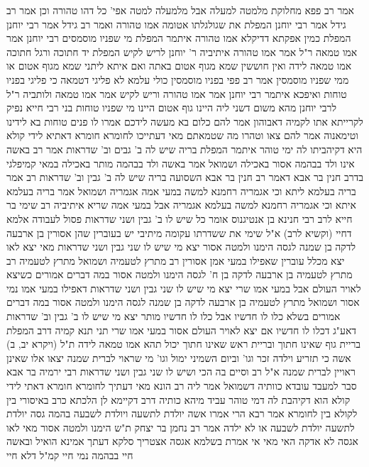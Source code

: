 \documentclass[12pt, openany]{book}
\begin{document}
{אמר רב פפא  מחלוקת מלמטה למעלה אבל מלמעלה למטה אפי' כל דהו טהורה  וכן אמר רב גידל אמר רבי יוחנן  המפלת את שגולגלתו אטומה אמו טהורה 
ואמר רב גידל אמר רבי יוחנן  המפלת כמין אפקתא דדיקלא אמו טהורה 
איתמר המפלת מי שפניו מוסמסים  רבי יוחנן אמר  אמו טמאה ר"ל אמר  אמו טהורה 
איתיביה ר' יוחנן לריש לקיש  המפלת יד חתוכה ורגל חתוכה אמו טמאה לידה ואין חוששין שמא מגוף אטום באתה  ואם איתא ליתני שמא מגוף אטום או ממי שפניו מוסמסין 
אמר רב פפי  בפניו מוסמסין כולי עלמא לא פליגי דטמאה כי פליגי בפניו טוחות ואיפכא איתמר רבי יוחנן אמר  אמו טהורה וריש לקיש אמר  אמו טמאה 
ולותביה ר"ל לרבי יוחנן מהא  משום דשני ליה  היינו גוף אטום היינו מי שפניו טוחות 
בני רבי חייא נפיק לקרייתא אתו לקמיה דאבוהון אמר להם   כלום בא מעשה לידכם  אמרו לו  פנים טוחות בא לידינו וטימאנוה 
אמר להם  צאו וטהרו מה שטמאתם  מאי דעתייכו לחומרא חומרא דאתיא לידי קולא היא דקיהביתו לה ימי טוהר 
איתמר המפלת בריה שיש לה ב' גבים וב' שדראות  אמר רב  באשה אינו ולד בבהמה אסור באכילה  ושמואל אמר  באשה ולד בבהמה מותר באכילה 
במאי קמיפלגי  בדרב חנין בר אבא דאמר רב חנין בר אבא  השסועה בריה שיש לה ב' גבין וב' שדראות 
רב אמר  בריה בעלמא ליתא וכי אגמריה רחמנא למשה במעי אמה אגמריה  ושמואל אמר  בריה בעלמא איתא וכי אגמריה רחמנא למשה בעלמא אגמריה אבל במעי אמה שריא 
איתיביה רב שימי בר חייא לרב  רבי חנינא בן אנטיגנוס אומר כל שיש לו ב' גבין ושני שדראות פסול לעבודה אלמא דחיי  (וקשיא לרב)  א"ל  שימי את  ששדרתו עקומה 
מיתיבי  יש בעוברין שהן אסורין  בן ארבעה לדקה בן שמנה לגסה הימנו ולמטה אסור  יצא מי שיש לו שני גבין ושני שדראות 
מאי יצא  לאו יצא מכלל עוברין שאפילו במעי אמן אסורין 
רב מתרץ לטעמיה ושמואל מתרץ לטעמיה  רב מתרץ לטעמיה  בן ארבעה לדקה בן ח' לגסה הימנו ולמטה אסור 
במה דברים אמורים כשיצא לאויר העולם אבל במעי אמו שרי יצא מי שיש לו שני גבין ושני שדראות דאפילו במעי אמו נמי אסור
ושמואל מתרץ לטעמיה  בן ארבעה לדקה בן שמנה לגסה הימנו ולמטה אסור  במה דברים אמורים בשלא כלו לו חדשיו אבל כלו לו חדשיו מותר  יצא מי שיש לו ב' גבין וב' שדראות דאע"ג דכלו לו חדשיו אם יצא לאויר העולם אסור במעי אמו שרי 
תני תנא קמיה דרב  המפלת בריית גוף שאינו חתוך ובריית ראש שאינו חתוך יכול תהא אמו טמאה לידה ת"ל (ויקרא יב, ב) אשה כי תזריע וילדה זכר וגו' וביום השמיני ימול וגו'
מי שראוי לברית שמנה יצאו אלו שאינן ראויין לברית שמנה  א"ל רב  וסיים בה הכי ושיש לו שני גבין ושני שדראות 
רבי ירמיה בר אבא סבר למעבד עובדא כוותיה דשמואל אמר ליה רב הונא  מאי דעתיך לחומרא  חומרא דאתי לידי קולא הוא דקיהבת לה דמי טוהר  עביד מיהא כותיה דרב דקיימא לן  הלכתא כרב באיסורי בין לקולא בין לחומרא 
אמר רבא  הרי אמרו אשה יולדת לתשעה ויולדת לשבעה בהמה גסה יולדת לתשעה יולדת לשבעה או לא ילדה 
אמר רב נחמן בר יצחק  ת"ש הימנו ולמטה אסור מאי לאו אגסה  לא אדקה 
האי מאי  אי אמרת בשלמא אגסה אצטריך סלקא דעתך אמינא  הואיל ובאשה חיי בבהמה נמי חיי קמ"ל דלא חיי 
}
\end{document}
